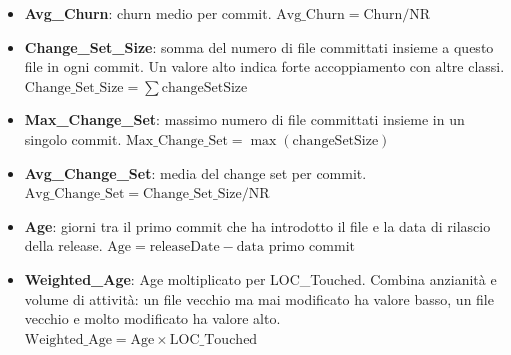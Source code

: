 \begin{itemize}
    \item \textbf{Avg\_Churn}: churn medio per commit.
    $\text{Avg\_Churn} = \text{Churn} / \text{NR}$

    \item \textbf{Change\_Set\_Size}: somma del numero di file committati insieme a questo
    file in ogni commit. Un valore alto indica forte accoppiamento con altre classi.
    $\text{Change\_Set\_Size} = \sum \text{changeSetSize}$

    \item \textbf{Max\_Change\_Set}: massimo numero di file committati insieme in un
    singolo commit.
    $\text{Max\_Change\_Set} = \max(\text{changeSetSize})$

    \item \textbf{Avg\_Change\_Set}: media del change set per commit.
    $\text{Avg\_Change\_Set} = \text{Change\_Set\_Size} / \text{NR}$

    \item \textbf{Age}: giorni tra il primo commit che ha introdotto il file e la data
    di rilascio della release.
    $\text{Age} = \text{releaseDate} - \text{data primo commit}$

    \item \textbf{Weighted\_Age}: Age moltiplicato per LOC\_Touched. Combina anzianità
    e volume di attività: un file vecchio ma mai modificato ha valore basso, un file
    vecchio e molto modificato ha valore alto.
    $\text{Weighted\_Age} = \text{Age} \times \text{LOC\_Touched}$
\end{itemize}

